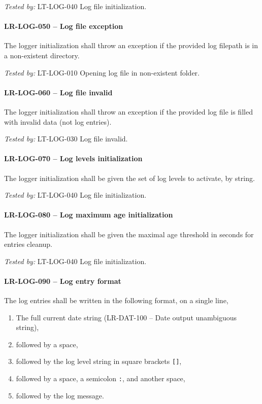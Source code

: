\textit{Tested by: } LT-LOG-040 Log file initialization.

\paragraph{LR-LOG-050 -- Log file exception}
The logger initialization shall throw an exception if the provided
log filepath is in a non-existent directory.

\textit{Tested by: } LT-LOG-010 Opening log file in non-existent folder.

\paragraph{LR-LOG-060 -- Log file invalid}
The logger initialization shall throw an exception if the provided
log file is filled with invalid data (not log entries).

\textit{Tested by: } LT-LOG-030 Log file invalid.

\paragraph{LR-LOG-070 -- Log levels initialization}
The logger initialization shall be given the set of log levels
to activate, by string.

\textit{Tested by: } LT-LOG-040 Log file initialization.

\paragraph{LR-LOG-080 -- Log maximum age initialization}
The logger initialization shall be given the maximal age threshold
in seconds for entries cleanup.

\textit{Tested by: } LT-LOG-040 Log file initialization.

\paragraph{LR-LOG-090 -- Log entry format}
The log entries shall be written in the following format,
on a single line,
\begin{enumerate}
\item The full current date string (LR-DAT-100 -- Date output unambiguous
  string),
\item followed by a space,
\item followed by the log level string in square brackets \lstinline{[]},
\item followed by a space, a semicolon \lstinline{:}, and another
  space,
\item followed by the log message.
\end{enumerate}

